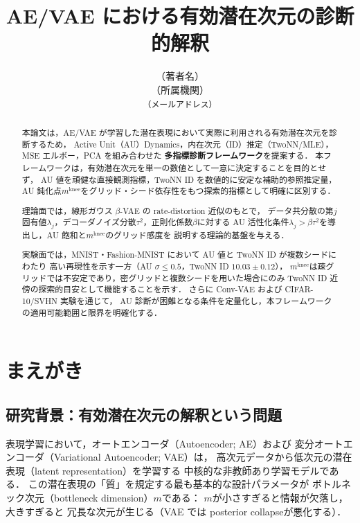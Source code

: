 \documentclass[11pt,a4paper]{jsarticle}
\title{AE/VAE における有効潜在次元の診断的解釈}
\author{（著者名）\\
{\small （所属機関）}\\
{\small \texttt{（メールアドレス）}}}
\date{}
\newcommand{\mknee}{m^{\mathrm{knee}}}
\begin{document}
\maketitle

\begin{abstract}
本論文は，AE/VAE が学習した潜在表現において実際に利用される有効潜在次元を診断するため，
Active Unit（AU）Dynamics，内在次元（ID）推定（TwoNN/MLE），MSE エルボー，PCA を組み合わせた
\textbf{多指標診断フレームワーク}を提案する．
本フレームワークは，有効潜在次元を単一の数値として一意に決定することを目的とせず，
AU 値を頑健な直接観測指標，TwoNN ID を数値的に安定な補助的参照推定量，
AU 鈍化点$\mknee$をグリッド・シード依存性をもつ探索的指標として明確に区別する．

理論面では，線形ガウス $\beta$-VAE の rate-distortion 近似のもとで，
データ共分散の第$j$固有値$\lambda_j$，デコーダノイズ分散$\tau^2$，正則化係数$\beta$に対する
AU 活性化条件$\lambda_j > \beta\tau^2$を導出し，AU 飽和と$\mknee$のグリッド感度を
説明する理論的基盤を与える．

実験面では，MNIST・Fashion-MNIST において AU 値と TwoNN ID が複数シードにわたり
高い再現性を示す一方（AU $\sigma \leq 0.5$，TwoNN ID $10.03 \pm 0.12$），
$\mknee$は疎グリッドでは不安定であり，密グリッドと複数シードを用いた場合にのみ
TwoNN ID 近傍の探索的目安として機能することを示す．
さらに Conv-VAE および CIFAR-10/SVHN 実験を通じて，
AU 診断が困難となる条件を定量化し，本フレームワークの適用可能範囲と限界を明確化する．
\end{abstract}

\section{まえがき}\label{sec:intro}

\subsection{研究背景：有効潜在次元の解釈という問題}\label{sec:intro_bg}

表現学習において，オートエンコーダ（Autoencoder; AE）および
変分オートエンコーダ（Variational Autoencoder; VAE）\cite{kingma2014vae}は，
高次元データから低次元の潜在表現（latent representation）を学習する
中核的な非教師あり学習モデルである\cite{bengio2013representation}．
この潜在表現の「質」を規定する最も基本的な設計パラメータが
ボトルネック次元（bottleneck dimension）$m$である：
$m$が小さすぎると情報が欠落し，大きすぎると
冗長な次元が生じる（VAE では posterior collapse\cite{lucas2019elbo}が悪化する）．
\end{document}
